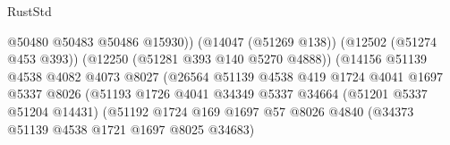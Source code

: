 \begin{lexlean}{RustStd}
\begin{coremodule}
                                                    @50480
                                                    @50483
                                                    @50486
                                                    @15930))
                                                (@14047 (@51269 @138))
                                                (@12502 (@51274 @453 @393))
                                                (@12250 (@51281 @393 @140 @5270 @4888))
                                                (@14156
                                                  @51139
                                                  @4538
                                                  @4082
                                                  @4073
                                                  @8027
                                                  (@26564
                                                    @51139
                                                    @4538
                                                    @419
                                                    @1724
                                                    @4041
                                                    @1697
                                                    @5337
                                                    @8026
                                                    (@51193
                                                      @1726
                                                      @4041
                                                      @34349
                                                      @5337
                                                      @34664
                                                      (@51201 @5337 @51204 @14431)
                                                      (@51192
                                                        @1724
                                                        @169
                                                        @1697
                                                        @57
                                                        @8026
                                                        @4840
                                                        (@34373
                                                          @51139
                                                          @4538
                                                          @1721
                                                          @1697
                                                          @8025
                                                          @34683)

\end{coremodule}
\end{lexlean}
